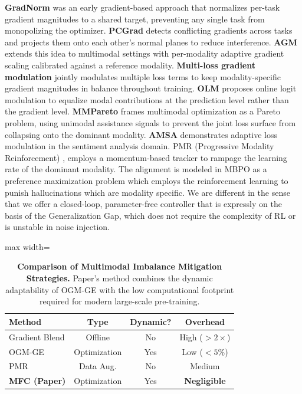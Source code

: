 \documentclass[preprint,a4paper, 10pt, 5p]{elsarticle}
\begin{document}
\textbf{GradNorm} \cite{chen2018gradnorm} was an early gradient-based approach that normalizes per-task gradient magnitudes to a shared target, preventing any single task from monopolizing the optimizer. \textbf{PCGrad} \cite{yu2020gradient} detects conflicting gradients across tasks and projects them onto each other's normal planes to reduce interference. \textbf{AGM} \cite{li2023boosting} extends this idea to multimodal settings with per-modality adaptive gradient scaling calibrated against a reference modality. \textbf{Multi-loss gradient modulation} \cite{kontras2024improving} jointly modulates multiple loss terms to keep modality-specific gradient magnitudes in balance throughout training. \textbf{OLM} \cite{zong2024balancing} proposes online logit modulation to equalize modal contributions at the prediction level rather than the gradient level. \textbf{MMPareto} \cite{wei2024mmpareto} frames multimodal optimization as a Pareto problem, using unimodal assistance signals to prevent the joint loss surface from collapsing onto the dominant modality. \textbf{AMSA} \cite{wang2023amsa} demonstrates adaptive loss modulation in the sentiment analysis domain. PMR (Progressive Modality Reinforcement) \cite{xu2025balancebenchmark}, employs a momentum-based tracker to rampage the learning rate of the dominant modality. The alignment is modeled in MBPO \cite{liu2025modality} as a preference maximization problem which employs the reinforcement learning to punish hallucinations which are modality specific. We are different in the sense that we offer a closed-loop, parameter-free controller that is expressly on the basis of the Generalization Gap, which does not require the complexity of RL or is unstable in noise injection.


\begin{table}[h]
\caption{\textbf{Comparison of Multimodal Imbalance Mitigation Strategies.} Paper's method combines the dynamic adaptability of OGM-GE with the low computational footprint required for modern large-scale pre-training.}
\label{tab:relwork}
\centering
\begin{adjustbox}{max width=\linewidth}\begin{tabular}{@{}lccc@{}}
\toprule
\textbf{Method} & \textbf{Type} & \textbf{Dynamic?} & \textbf{Overhead} \\ \midrule
Gradient Blend \cite{wang2020makes} & Offline & No & High ($>2\times$) \\
OGM-GE \cite{peng2022balanced} & Optimization & Yes & Low ($<5\%$) \\
PMR \cite{xu2025balancebenchmark} & Data Aug. & No & Medium \\
\textbf{MFC (Paper)} & Optimization & Yes & \textbf{Negligible} \\ \bottomrule
\end{tabular}\end{adjustbox}
\end{table}
\end{document}
